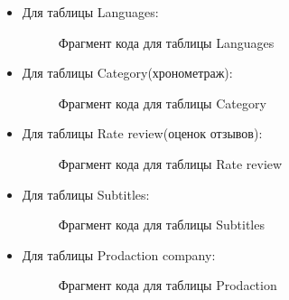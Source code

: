 \begin{itemize}
\item Для таблицы Languages:
\begin{figure} [h]
    \caption{Фрагмент кода для таблицы Languages}
\end{figure}

\item Для таблицы Category(хронометраж):
\begin{figure} [h]
    \caption{Фрагмент кода для таблицы Category}
\end{figure}

\item Для таблицы Rate review(оценок отзывов):
\begin{figure} [h]
    \caption{Фрагмент кода для таблицы Rate review}
\end{figure}

\item Для таблицы Subtitles:
\begin{figure} [h]
    \caption{Фрагмент кода для таблицы Subtitles}
\end{figure}

\item Для таблицы Prodaction company:
\begin{figure} [h]
    \caption{Фрагмент кода для таблицы Prodaction}
\end{figure}

\end{itemize}


